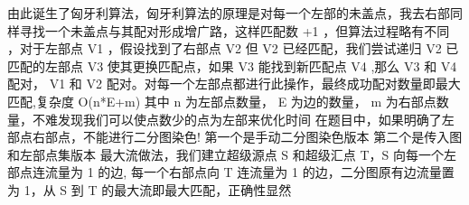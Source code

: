 {}由此诞生了匈牙利算法，匈牙利算法的原理是对每一个左部的未盖点，我去右部同样寻找一个未盖点与其配对形成增广路，这样匹配数\markdownRendererDollarSign{} +1 \markdownRendererDollarSign{}，但算法过程略有不同 ，对于左部点\markdownRendererDollarSign{} V1 \markdownRendererDollarSign{}，假设找到了右部点\markdownRendererDollarSign{} V2 \markdownRendererDollarSign{}但\markdownRendererDollarSign{} V2 \markdownRendererDollarSign{}已经匹配，我们尝试递归\markdownRendererDollarSign{} V2 \markdownRendererDollarSign{}已匹配的左部点\markdownRendererDollarSign{} V3 \markdownRendererDollarSign{}使其更换匹配点，如果\markdownRendererDollarSign{} V3 \markdownRendererDollarSign{}能找到新匹配点\markdownRendererDollarSign{} V4 \markdownRendererDollarSign{},那么\markdownRendererDollarSign{} V3 \markdownRendererDollarSign{}和\markdownRendererDollarSign{} V4 \markdownRendererDollarSign{}配对，\markdownRendererDollarSign{} V1 \markdownRendererDollarSign{}和\markdownRendererDollarSign{} V2 \markdownRendererDollarSign{}配对。对每一个左部点都进行此操作，最终成功配对数量即最大匹配,复杂度\markdownRendererDollarSign{} O(n*E+m) \markdownRendererDollarSign{}其中\markdownRendererDollarSign{} n \markdownRendererDollarSign{}为左部点数量，\markdownRendererDollarSign{} E \markdownRendererDollarSign{}为边的数量，\markdownRendererDollarSign{} m \markdownRendererDollarSign{}为右部点数量，不难发现我们可以使点数少的点为左部来优化时间\markdownRendererParagraphSeparator
{}在题目中，如果明确了左部点右部点，不能进行二分图染色!\markdownRendererParagraphSeparator
{}第一个是手动二分图染色版本\markdownRendererInterblockSeparator
{}\markdownRendererInterblockSeparator
{}第二个是传入图和左部点集版本\markdownRendererInterblockSeparator
{}\markdownRendererInterblockSeparator
{}最大流做法，我们建立超级源点 \markdownRendererDollarSign{}S\markdownRendererDollarSign{} 和超级汇点 \markdownRendererDollarSign{}T\markdownRendererDollarSign{}，\markdownRendererDollarSign{}S\markdownRendererDollarSign{} 向每一个左部点连流量为 \markdownRendererDollarSign{}1\markdownRendererDollarSign{} 的边, 每一个右部点向 \markdownRendererDollarSign{}T\markdownRendererDollarSign{} 连流量为 \markdownRendererDollarSign{}1\markdownRendererDollarSign{} 的边，二分图原有边流量置为 \markdownRendererDollarSign{}1\markdownRendererDollarSign{}，从 \markdownRendererDollarSign{}S\markdownRendererDollarSign{} 到 \markdownRendererDollarSign{}T\markdownRendererDollarSign{} 的最大流即最大匹配，正确性显然\markdownRendererParagraphSeparator
